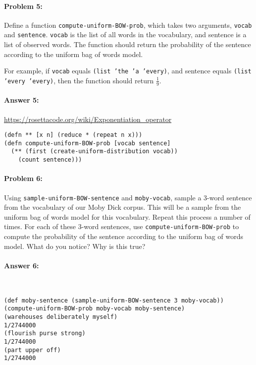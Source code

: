 \documentclass[12pt, letterpaper]{article}
\begin{document}
\hrulefill
\paragraph{Problem 5:}

Define a function \texttt{compute-uniform-BOW-prob}, which takes two
arguments, \texttt{vocab} and \texttt{sentence}. \texttt{vocab} is the
list of all words in the vocabulary, and sentence is a list of
observed words. The function should return the probability of the
sentence according to the uniform bag of words model.

For example, if \texttt{vocab} equals \texttt{(list 'the 'a 'every)},
and sentence equals \texttt{(list 'every 'every)}, then the function
should return $\frac{1}{9}$.

\paragraph{Answer 5:}
\url{https://rosettacode.org/wiki/Exponentiation_operator}
\begin{lstlisting}
(defn ** [x n] (reduce * (repeat n x)))
(defn compute-uniform-BOW-prob [vocab sentence]
  (** (first (create-uniform-distribution vocab))
    (count sentence)))
\end{lstlisting}

\hrulefill
\paragraph{Problem 6:}

Using \texttt{sample-uniform-BOW-sentence} and \texttt{moby-vocab},
sample a 3-word sentence from the vocabulary of our Moby Dick
corpus. This will be a sample from the uniform bag of words model for
this vocabulary. Repeat this process a number of times. For each of
these 3-word sentences, use \texttt{compute-uniform-BOW-prob} to
compute the probability of the sentence according to the uniform bag
of words model. What do you notice? Why is this true?

\paragraph{Answer 6:}~\begin{lstlisting}
(def moby-sentence (sample-uniform-BOW-sentence 3 moby-vocab))
(compute-uniform-BOW-prob moby-vocab moby-sentence)
(warehouses deliberately myself)
1/2744000
(flourish purse strong)
1/2744000
(part upper off)
1/2744000
\end{lstlisting}
\end{document}
